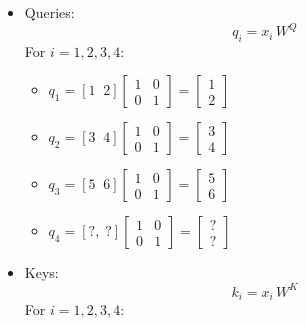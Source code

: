 \begin{itemize}
	\item Queries:  
   \[
     q_i = x_i \, W^Q 
   \]
   For \(i=1,2,3,4\):
   \begin{itemize}
	   \item \(q_1 = [1\;\;2] \begin{bmatrix}1 & 0 \\ 0 & 1\end{bmatrix} = \begin{bmatrix}1 \\ 2\end{bmatrix}\)
	   \item \(q_2 = [3\;\;4] \begin{bmatrix}1 & 0 \\ 0 & 1\end{bmatrix} = \begin{bmatrix}3 \\ 4\end{bmatrix}\)
	   \item \(q_3 = [5\;\;6] \begin{bmatrix}1 & 0 \\ 0 & 1\end{bmatrix} = \begin{bmatrix}5 \\ 6\end{bmatrix}\)
	   \item \(q_4 = [?,\; ?] \begin{bmatrix}1 & 0 \\ 0 & 1\end{bmatrix} = \begin{bmatrix}? \\ ?\end{bmatrix}\)
   \end{itemize}
	\item Keys:
	   \[
		 k_i = x_i \, W^K
	   \]
	   For \(i=1,2,3,4\):
\end{itemize}
